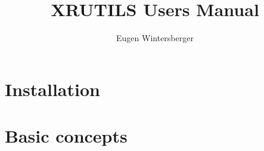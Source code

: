 \documentclass[a4paper]{book}
\title{{\Huge XRUTILS Users Manual}}
\author{Eugen Wintersberger}
\begin{document}
\maketitle
\tableofcontents
\chapter{Installation}


\chapter{Basic concepts}

\end{document}
